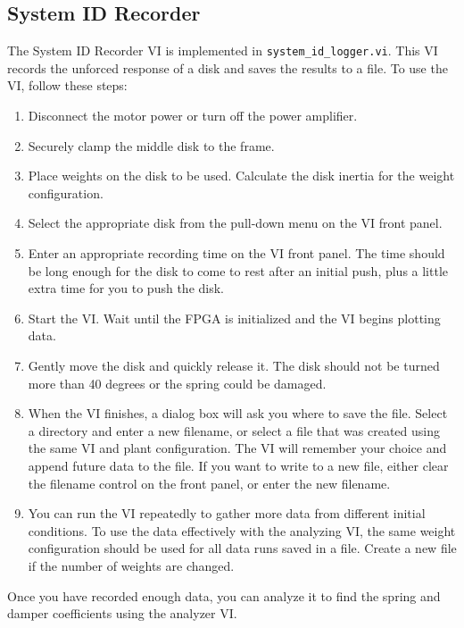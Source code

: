 \subsection{System ID Recorder}
    The System ID Recorder VI is implemented in
    \texttt{system\_id\_logger.vi}.  This VI records the unforced
    response of a disk and saves the results to a file. To use the VI,
    follow these steps:


\begin{enumerate}
   \item Disconnect the motor power or turn off the power amplifier.
   \item Securely clamp the middle disk to the frame. 
   \item Place weights on the disk to be used.  Calculate the disk
       inertia for the weight configuration.
   \item Select the appropriate disk from the pull-down menu on the VI
       front panel.
   \item Enter an appropriate recording time on the VI front panel.
      The time should be long enough for the disk to come to rest
      after an initial push, plus a little extra time for you to push
      the disk.
   \item Start the VI.  Wait until the FPGA is initialized and the VI
      begins plotting data.
   \item Gently move the disk and quickly release it.  The disk should
      not be turned more than 40 degrees or the spring could be
      damaged.
   \item When the VI finishes, a dialog box will ask you where to save
      the file.  Select a directory and enter a new filename, or
      select a file that was created using the same VI and plant
      configuration.  The VI will remember your choice and append
      future data to the file.  If you want to write to a new file,
      either clear the filename control on the front panel, or enter
      the new filename.
   \item You can run the VI repeatedly to gather more data from
   different initial conditions.  To use the data effectively with the
   analyzing VI, the same weight configuration should be used for all
   data runs saved in a file.  Create a new file if the number of
   weights are changed.

\end{enumerate}

Once you have recorded enough data, you can analyze it to find the
spring and damper coefficients using the analyzer VI.

